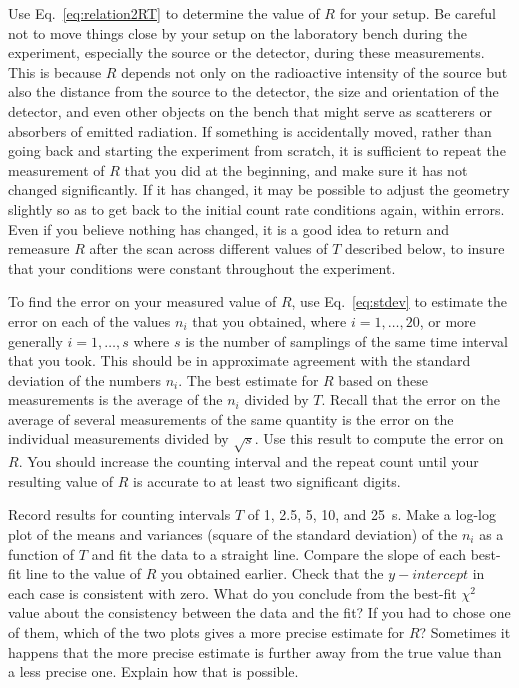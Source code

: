 \documentclass{revtex4}
\begin{document}
Use Eq.~\ref{eq:relation2RT} to determine the value of $R$ for your setup.  Be
careful not to move things close by your setup on the laboratory bench
during the experiment, especially the source or the detector, during these
measurements.  This is because $R$ depends not only on the radioactive
intensity of the source but also the distance from the source to the detector,
the size and orientation of the detector, and even other objects on the bench
that might serve as scatterers or absorbers of emitted radiation.  If
something is accidentally moved, rather than going back and starting the
experiment from scratch, it is sufficient to repeat the measurement of $R$
that you did at the beginning, and make sure it has not changed significantly.
If it has changed, it may be possible to adjust the geometry slightly so as
to get back to the initial count rate conditions again, within errors.
Even if you believe nothing has changed, it is a good idea to return and
remeasure $R$ after the scan across different values of $T$ described below,
to insure that your conditions were constant throughout the experiment.

To find the error on your measured value of $R$, use Eq.~\ref{eq:stdev} to
estimate the error on each of the values $n_i$ that you obtained, where 
$i=1,\ldots,20$, or more generally $i=1,\ldots,s$ where $s$ is the number
of samplings of the same time interval that you took.  This should be in
approximate agreement with the standard deviation of the numbers $n_i$.
The best estimate for $R$ based on these measurements is the average of
the $n_i$ divided by $T$.  Recall that the error on the average of several
measurements of the same quantity is the error on the individual measurements
divided by $\sqrt{s}$.  Use this result to compute the error on $R$.  You
should increase the counting interval and the repeat count until your 
resulting value of $R$ is accurate to at least two significant digits.

Record results for counting intervals $T$ of 1, 2.5, 5, 10, and 25~s.
Make a log-log plot of the means and variances (square of the standard
deviation) of the $n_i$ as a function of $T$ and fit the data to a straight
line.  Compare the slope of each best-fit line to the value of $R$ you
obtained earlier.  Check that the $y-intercept$ in each case is consistent
with zero.  What do you conclude from the best-fit $\chi^2$ value about the
consistency between the data and the fit?  If you had to chose one of them,
which of the two plots gives a more precise estimate for $R$?  Sometimes
it happens that the more precise estimate is further away from the true
value than a less precise one.  Explain how that is possible.
\end{document}
